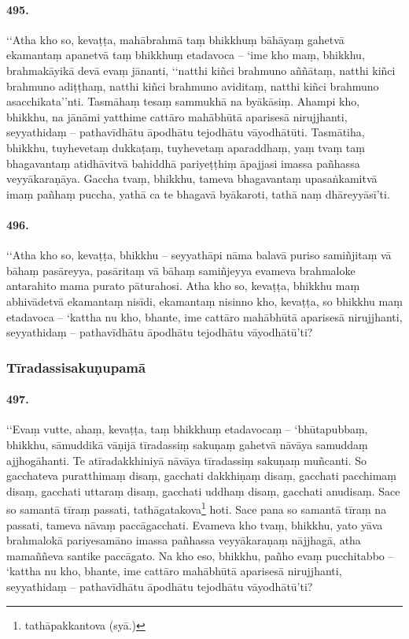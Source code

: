\paragraph{495.} ‘‘Atha kho so, kevaṭṭa, mahābrahmā taṃ bhikkhuṃ bāhāyaṃ gahetvā ekamantaṃ apanetvā taṃ bhikkhuṃ etadavoca – ‘ime kho maṃ, bhikkhu, brahmakāyikā devā evaṃ jānanti, ‘‘natthi kiñci brahmuno aññātaṃ, natthi kiñci brahmuno adiṭṭhaṃ, natthi kiñci brahmuno aviditaṃ, natthi kiñci brahmuno asacchikata’’nti. Tasmāhaṃ tesaṃ sammukhā na byākāsiṃ. Ahampi kho, bhikkhu, na jānāmi yatthime cattāro mahābhūtā aparisesā nirujjhanti, seyyathidaṃ – pathavīdhātu āpodhātu tejodhātu vāyodhātūti. Tasmātiha, bhikkhu, tuyhevetaṃ dukkaṭaṃ, tuyhevetaṃ aparaddhaṃ, yaṃ tvaṃ taṃ bhagavantaṃ atidhāvitvā bahiddhā pariyeṭṭhiṃ āpajjasi imassa pañhassa veyyākaraṇāya. Gaccha tvaṃ, bhikkhu, tameva bhagavantaṃ upasaṅkamitvā imaṃ pañhaṃ puccha, yathā ca te bhagavā byākaroti, tathā naṃ dhāreyyāsī’ti.

\paragraph{496.} ‘‘Atha kho so, kevaṭṭa, bhikkhu – seyyathāpi nāma balavā puriso samiñjitaṃ vā bāhaṃ pasāreyya, pasāritaṃ vā bāhaṃ samiñjeyya evameva brahmaloke antarahito mama purato pāturahosi. Atha kho so, kevaṭṭa, bhikkhu maṃ abhivādetvā ekamantaṃ nisīdi, ekamantaṃ nisinno kho, kevaṭṭa, so bhikkhu maṃ etadavoca – ‘kattha nu kho, bhante, ime cattāro mahābhūtā aparisesā nirujjhanti, seyyathidaṃ – pathavīdhātu āpodhātu tejodhātu vāyodhātū’ti?

\subsubsection{Tīradassisakuṇupamā}

\paragraph{497.} ‘‘Evaṃ vutte, ahaṃ, kevaṭṭa, taṃ bhikkhuṃ etadavocaṃ – ‘bhūtapubbaṃ, bhikkhu, sāmuddikā vāṇijā tīradassiṃ sakuṇaṃ gahetvā nāvāya samuddaṃ ajjhogāhanti. Te atīradakkhiniyā nāvāya tīradassiṃ sakuṇaṃ muñcanti. So gacchateva puratthimaṃ disaṃ, gacchati dakkhiṇaṃ disaṃ, gacchati pacchimaṃ disaṃ, gacchati uttaraṃ disaṃ, gacchati uddhaṃ disaṃ, gacchati anudisaṃ. Sace so samantā tīraṃ passati, tathāgatakova\footnote{tathāpakkantova (syā.)} hoti. Sace pana so samantā tīraṃ na passati, tameva nāvaṃ paccāgacchati. Evameva kho tvaṃ, bhikkhu, yato yāva brahmalokā pariyesamāno imassa pañhassa veyyākaraṇaṃ nājjhagā, atha mamaññeva santike paccāgato. Na kho eso, bhikkhu, pañho evaṃ pucchitabbo – ‘kattha nu kho, bhante, ime cattāro mahābhūtā aparisesā nirujjhanti, seyyathidaṃ – pathavīdhātu āpodhātu tejodhātu vāyodhātū’ti?

